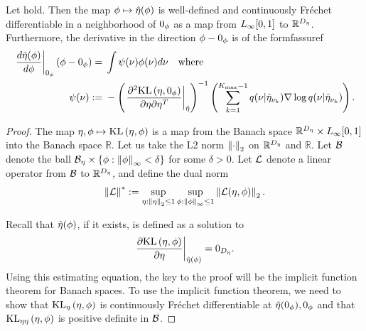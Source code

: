 \begin{thm}
%
Let  hold. Then the map $\phi \mapsto \hat\eta(\phi)$ is
well-defined and continuously Fr{\'e}chet differentiable in a neighborhood of
$0_\phi$ as a map from ${L_{\infty}[0,1]}$ to $\mathbb{R}^{D_{\eta}}$. Furthermore, the
derivative in the direction $\phi - 0_\phi$ is of the formfassuref
%
\begin{align*}
%
\fracat{d \etaopt(\phi)}{d\phi}{\phiz}\left( \phi - \phiz\right) ={}&
    \int \infl(\nu) \phi(\nu) d\nu \mathtxt{where} \\
%
\infl(\nu) :={}&
-\left(\fracat{\partial^2 \KL{\eta, \phiz}}
                {\partial \eta \partial \eta^T}
                {\etaopt}\right)^{-1}
\left(
    \sumkm
    \q(\nu \vert \etaoptnuk)
    \nabla \log \q(\nu \vert \etaoptnuk)
\right).
%
\end{align*}
%

%

\begin{proof}
%
The map $\eta, \phi \mapsto \mathrm{KL}\left(\eta, \phi\right)$ is a map from the Banach space
$\mathbb{R}^{D_{\eta}} \times {L_{\infty}[0,1]}$ into the Banach space $\mathbb{R}$. Let us
take the L2 norm $\left\Vert\cdot\right\Vert_2$ on $\mathbb{R}^{{D_{\eta}}}$ and $\mathbb{R}$.
Let $\mathcal{B}$ denote the ball $\mathcal{B}_\eta \times \{ \phi: \left\Vert\phi\right\Vert_{\infty} <
\delta\}$ for some $\delta > 0$.  Let $\mathcal{L}$ denote a linear operator from
$\mathcal{B}$ to $\mathbb{R}^{D_{\eta}}$, and define the dual norm
%
\begin{align*}
%
\norm{\linop}^* :=
    \sup_{\eta: \norm{\eta}_2 \le 1} \sup_{\phi: \norminf{\phi} \le 1}
     \norm{\linop(\eta, \phi)}_2.
%
\end{align*}

Recall that $\hat\eta(\phi)$, if it exists, is defined as a solution to
%
\begin{align*}
%
\fracat{\partial \KL{\eta, \phi}}
                {\partial \eta}
                {\etaopt(\phi)} = 0_\etadim.
%
\end{align*}
%
Using this estimating equation, the key to the proof will be the implicit
function theorem for Banach spaces. To use the implicit function theorem, we
need to show that $\mathrm{KL}_{\eta}\left(\eta, \phi\right)$ is continuously Fr{\'e}chet
differentiable at $\hat\eta(0_\phi), 0_\phi$ and that $\mathrm{KL}_{\eta\eta}\left(\eta, \phi\right)$ is
positive definite in $\mathcal{B}$.


\end{proof}
\end{thm}
